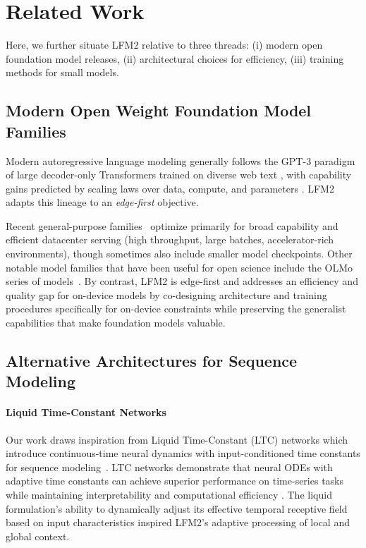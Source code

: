 \documentclass{article}
\begin{document}
\section{Related Work}
\label{sec:related_work}
Here, we further situate LFM2 relative to three threads: (i) modern open foundation model releases, (ii) architectural choices for efficiency, (iii) training methods for small models.

\subsection{Modern Open Weight Foundation Model Families}
Modern autoregressive language modeling generally follows the GPT-3 paradigm of large decoder-only Transformers trained on diverse web text \citep{brown2020language}, with capability gains predicted by scaling laws over data, compute, and parameters \citep{kaplan2020scaling,hoffmann2022training}. LFM2 adapts this lineage to an \emph{edge-first} objective.

Recent general-purpose families~\citep{liu2024deepseek, yang2025qwen3,grattafiori2024llama, team2025gemma} optimize primarily for broad capability and efficient datacenter serving (high throughput, large batches, accelerator-rich environments), though sometimes also include smaller model checkpoints. Other notable model families that have been useful for open science include the OLMo series of models~\citep{groeneveld2024olmo, olmo20242,muennighoff2024olmoe}. By contrast, LFM2 is edge-first and addresses an efficiency and quality gap for on-device models by co-designing architecture and training procedures specifically for on-device constraints while preserving the generalist capabilities that make foundation models valuable.



\subsection{Alternative Architectures for Sequence Modeling}
\label{subsec:rel_work_alt_seq}
\paragraph{Liquid Time-Constant Networks}
Our work draws inspiration from Liquid Time-Constant (LTC) networks which introduce continuous-time neural dynamics with input-conditioned time constants for sequence modeling~\citep{hasani2021liquid, lechner2020neural, hasani2022closed}. LTC networks demonstrate that neural ODEs with adaptive time constants can achieve superior performance on time-series tasks while maintaining interpretability and computational efficiency \citep{chahine2023robust,hasani2020natural,vorbach2021causal,lechner2020gershgorin, lechner2019designing}. The liquid formulation's ability to dynamically adjust its effective temporal receptive field based on input characteristics inspired LFM2's adaptive processing of local and global context. 
\end{document}
